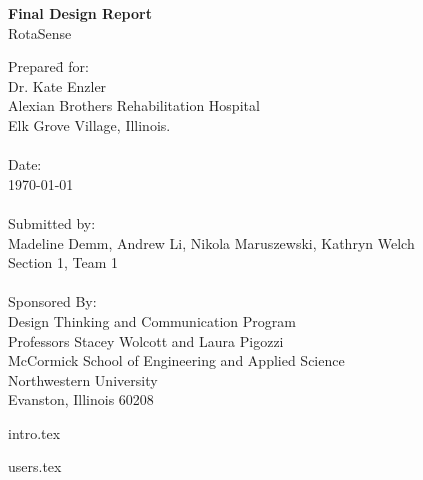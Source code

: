 \documentclass{book}
\begin{document}

\frontmatter

\begin{titlepage}
   \begin{center}
      \huge\textbf{Final Design Report}\\
		\LARGE{RotaSense}\\ \leavevmode
   \end{center}
   
   \large
   \begin{tabbing}
	Prepare\=d for:\\
	\> Dr. Kate Enzler\\
	\> Alexian Brothers Rehabilitation Hospital\\
	\> Elk Grove Village, Illinois.\\
	\\
	Date:\\
	\> \today\\
	\\
	Submitted by:\\
	\> Madeline Demm, Andrew Li, Nikola Maruszewski, Kathryn Welch\\
	\> Section 1, Team 1\\
	\\
	Sponsored By:\\
	\> Design Thinking and Communication Program\\
	\> Professors Stacey Wolcott and Laura Pigozzi\\
	\> McCormick School of Engineering and Applied Science\\
	\> Northwestern University\\
	\> Evanston, Illinois 60208\\
	\end{tabbing}
	\normalsize
\end{titlepage}



\tableofcontents
\listoffigures
\listoftables

\mainmatter

{intro.tex}

{users.tex}
\end{document}
